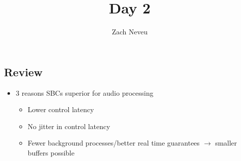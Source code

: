 \documentclass[12pt, letter]{article}
\author{Zach Neveu}
\title{ Day 2 }
\begin{document}
\maketitle

\subsection*{Review}
\begin{itemize}
	\item 3 reasons SBCs superior for audio processing
	\begin{itemize}
		\item Lower control latency
		\item No jitter in control latency
		\item Fewer background processes/better real time guarantees $\to$ smaller buffers possible
	\end{itemize}
\end{itemize}
\end{document}
